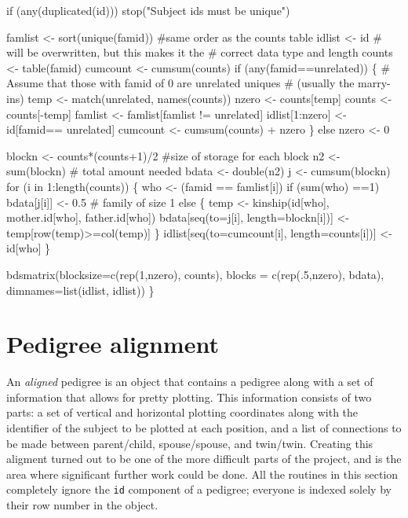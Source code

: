 \documentclass{article}
\begin{document}
    if (any(duplicated(id))) stop("Subject ids must be unique")

    famlist <- sort(unique(famid))  #same order as the counts table
    idlist <- id            # will be overwritten, but this makes it the
                            #  correct data type and length
    counts <- table(famid)
    cumcount <- cumsum(counts)    
     if (any(famid==unrelated)) \{
        # Assume that those with famid of 0 are unrelated uniques
        #   (usually the marry-ins)
        temp <- match(unrelated, names(counts))
        nzero <- counts[temp]    
        counts <- counts[-temp]
        famlist <- famlist[famlist != unrelated]
        idlist[1:nzero] <- id[famid== unrelated]
        cumcount <- cumsum(counts) + nzero
        \}
    else nzero <- 0
    
    blockn <- counts*(counts+1)/2   #size of storage for each block
    n2 <- sum(blockn)       # total amount needed
    bdata <- double(n2)
    j <- cumsum(blockn)     
    for (i in 1:length(counts)) \{
        who <- (famid == famlist[i])
        if (sum(who) ==1) bdata[j[i]] <- 0.5  # family of size 1
        else \{
            temp <- kinship(id[who], mother.id[who], father.id[who])
            bdata[seq(to=j[i], length=blockn[i])] <- temp[row(temp)>=col(temp)]
            \}
        idlist[seq(to=cumcount[i], length=counts[i])] <- id[who]
        \}

    bdsmatrix(blocksize=c(rep(1,nzero), counts),
              blocks =  c(rep(.5,nzero), bdata),
              dimnames=list(idlist, idlist))
    \}
\nwendcode{}\nwdocspar




\section{Pedigree alignment}
An \emph{aligned} pedigree is an object that contains a pedigree along
with a set of information that allows for pretty plotting.
This information consists of two parts: 
a set of vertical and horizontal plotting coordinates along with the
identifier of the subject to be plotted at each position,
and a list of connections to be made between parent/child, spouse/spouse,
and twin/twin.
Creating this aligment turned out to be one of the more difficult parts
of the project, and is the area where significant further work could be
done.  
All the routines in this section completely ignore the {\tt{}id} component
of a pedigree; everyone is indexed solely by their row number in the object.
\end{document}
